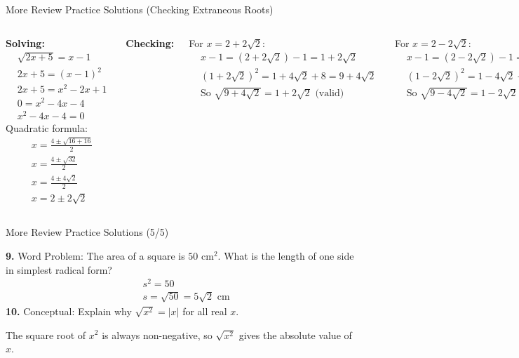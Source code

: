 \documentclass[aspectratio=169]{beamer}
\begin{document}
\begin{frame}{More Review Practice Solutions (Checking Extraneous Roots)}
\begin{tcolorbox}[colback=lightgray,colframe=primary,title=Solution: $\sqrt{2x+5} = x-1$]
\footnotesize
\begin{columns}[T]
\textbf{Solving:}
\begin{align*}
  &\sqrt{2x+5} = x-1 \\
  &2x+5 = (x-1)^2 \\
  &2x+5 = x^2-2x+1 \\
  &0 = x^2-4x-4 \\
  &x^2-4x-4=0
\end{align*}
Quadratic formula:
\begin{align*}
  &x = \frac{4 \pm \sqrt{16+16}}{2} \\
  &x = \frac{4 \pm \sqrt{32}}{2} \\
  &x = \frac{4 \pm 4\sqrt{2}}{2} \\
  &x = 2 \pm 2\sqrt{2}
\end{align*}

\textbf{Checking:}

For $x = 2 + 2\sqrt{2}$:
\begin{align*}
  &x-1 = (2+2\sqrt{2})-1 = 1+2\sqrt{2} \\
  &(1+2\sqrt{2})^2 = 1 + 4\sqrt{2} + 8 = 9 + 4\sqrt{2} \\
  &\text{So } \sqrt{9+4\sqrt{2}} = 1+2\sqrt{2} \text{ (valid)}
\end{align*}

For $x = 2 - 2\sqrt{2}$:
\begin{align*}
  &x-1 = (2-2\sqrt{2})-1 = 1-2\sqrt{2} \\
  &(1-2\sqrt{2})^2 = 1 - 4\sqrt{2} + 8 = 9 - 4\sqrt{2} \\
  &\text{So } \sqrt{9-4\sqrt{2}} = 1-2\sqrt{2} \text{ (valid)}
\end{align*}

\textbf{Conclusion:} Both $x = 2 + 2\sqrt{2}$ and $x = 2 - 2\sqrt{2}$ are valid solutions (no extraneous roots).
\end{columns}
\end{tcolorbox}
\end{frame}

\begin{frame}{More Review Practice Solutions (5/5)}
\begin{tcolorbox}[colback=lightgray,colframe=primary,title=Solutions]
\footnotesize
\textbf{9.} Word Problem: The area of a square is $50$ cm$^2$. What is the length of one side in simplest radical form?
\begin{align*}
  &s^2 = 50 \\
  &s = \sqrt{50} = 5\sqrt{2} \text{ cm}
\end{align*}
\vspace{0.5em}
\textbf{10.} Conceptual: Explain why $\sqrt{x^2} = |x|$ for all real $x$.

The square root of $x^2$ is always non-negative, so $\sqrt{x^2}$ gives the absolute value of $x$.
\end{tcolorbox}
\end{frame}
\end{document}

